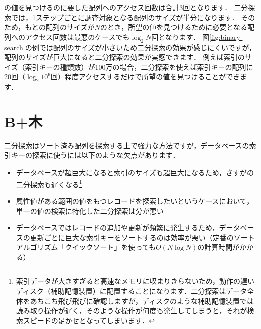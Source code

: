 の値を見つけるのに要した配列へのアクセス回数は合計3回となります．
二分探索では，1ステップごとに調査対象となる配列のサイズが半分になります．
そのため，もとの配列のサイズが$N$のとき，所望の値を見つけるために必要となる配列へのアクセス回数は最悪のケースでも$\log_2 N$回となります．
図\ref{fig:binary-search}の例では配列のサイズが小さいため二分探索の効果が感じにくいですが，配列のサイズが巨大になると二分探索の効果が実感できます．
例えば索引のサイズ（索引キーの種類数）が100万の場合，二分探索を使えば索引キーの配列に20回（$\log_2 10^6$回）程度アクセスするだけで所望の値を見つけることができます．


\section{B+木}
二分探索はソート済み配列を探索する上で強力な方法ですが，データベースの索引キーの探索に使うには以下のような欠点があります．
\begin{itemize}
\item データベースが超巨大になると索引のサイズも超巨大になるため，さすがの二分探索も遅くなる\footnote{索引データが大きすぎると高速なメモリに収まりきらないため，動作の遅いディスク（補助記憶装置）に配置することになります．二分探索はデータ全体をあちこち飛び飛びに確認しますが，ディスクのような補助記憶装置では読み取り操作が遅く，そのような操作が何度も発生してしまうと，それが検索スピードの足かせとなってしまいます．}
\item 属性値がある範囲の値をもつレコードを探索したいというケースにおいて，単一の値の検索に特化した二分探索は分が悪い
\item データベースではレコードの追加や更新が頻繁に発生するため，データベースの更新ごとに巨大な索引キーをソートするのは効率が悪い（定番のソートアルゴリズム「クイックソート」を使っても$O(N \log N)$の計算時間がかかる）
\end{itemize}

